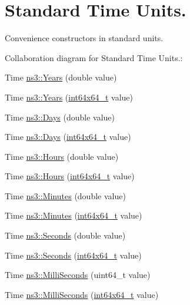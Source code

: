 \hypertarget{group__timecivil}{}\section{Standard Time Units.}
\label{group__timecivil}


Convenience constructors in standard units.  


Collaboration diagram for Standard Time Units.\+:
\begin{DoxyCompactItemize}
\item 
Time \hyperlink{group__timecivil_gacba71dd5cfeb7aa46f08a20260247975}{ns3\+::\+Years} (double value)
\item 
Time \hyperlink{group__timecivil_ga6908a3ce36aeef5fee0ea41ff6e7a1fb}{ns3\+::\+Years} (\hyperlink{classint64x64__t}{int64x64\+\_\+t} value)
\item 
Time \hyperlink{group__timecivil_ga58292fd2de67cc4ccd619ca83d28574b}{ns3\+::\+Days} (double value)
\item 
Time \hyperlink{group__timecivil_ga403cbc20d7d2533f6ced509e5ebaf981}{ns3\+::\+Days} (\hyperlink{classint64x64__t}{int64x64\+\_\+t} value)
\item 
Time \hyperlink{group__timecivil_ga6059b5d67fe1e174729c063be4fa2bf7}{ns3\+::\+Hours} (double value)
\item 
Time \hyperlink{group__timecivil_ga29967d3f5a5308049182163b6531538f}{ns3\+::\+Hours} (\hyperlink{classint64x64__t}{int64x64\+\_\+t} value)
\item 
Time \hyperlink{group__timecivil_gaaab039c044ad40238a9d5b556349d0d5}{ns3\+::\+Minutes} (double value)
\item 
Time \hyperlink{group__timecivil_gad1d65647c9da93fd8679b9d87e04c7f4}{ns3\+::\+Minutes} (\hyperlink{classint64x64__t}{int64x64\+\_\+t} value)
\item 
Time \hyperlink{group__timecivil_ga33c34b816f8ff6628e33d5c8e9713b9e}{ns3\+::\+Seconds} (double value)
\item 
Time \hyperlink{group__timecivil_ga8f78ae67044d734a45fa1a979d7ea1b3}{ns3\+::\+Seconds} (\hyperlink{classint64x64__t}{int64x64\+\_\+t} value)
\item 
Time \hyperlink{group__timecivil_gaf26127cf4571146b83a92ee18679c7a9}{ns3\+::\+Milli\+Seconds} (uint64\+\_\+t value)
\item 
Time \hyperlink{group__timecivil_ga2bf74bc619c2bd0c88126e60a278bc2a}{ns3\+::\+Milli\+Seconds} (\hyperlink{classint64x64__t}{int64x64\+\_\+t} value)
\item 

\end{DoxyCompactItemize}
